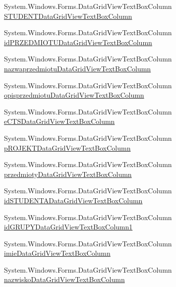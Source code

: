 \begin{DoxyCompactItemize}
\item 
System.\+Windows.\+Forms.\+Data\+Grid\+View\+Text\+Box\+Column \hyperlink{class_dziennik_ocen_1_1_form_admin_a6917f007b27f260cce5ecfd24aa351f7}{S\+T\+U\+D\+E\+N\+T\+Data\+Grid\+View\+Text\+Box\+Column}
\item 
System.\+Windows.\+Forms.\+Data\+Grid\+View\+Text\+Box\+Column \hyperlink{class_dziennik_ocen_1_1_form_admin_a26e4a3fa2dc997dc2639bad664efcf95}{id\+P\+R\+Z\+E\+D\+M\+I\+O\+T\+U\+Data\+Grid\+View\+Text\+Box\+Column}
\item 
System.\+Windows.\+Forms.\+Data\+Grid\+View\+Text\+Box\+Column \hyperlink{class_dziennik_ocen_1_1_form_admin_aabccbc0a74ca00a35018db908f23d017}{nazwaprzedmiotu\+Data\+Grid\+View\+Text\+Box\+Column}
\item 
System.\+Windows.\+Forms.\+Data\+Grid\+View\+Text\+Box\+Column \hyperlink{class_dziennik_ocen_1_1_form_admin_afa13eec734673382f86da87f33c5e52c}{opisprzedmiotu\+Data\+Grid\+View\+Text\+Box\+Column}
\item 
System.\+Windows.\+Forms.\+Data\+Grid\+View\+Text\+Box\+Column \hyperlink{class_dziennik_ocen_1_1_form_admin_a0680998f0013ced8888ab26f994b4312}{e\+C\+T\+S\+Data\+Grid\+View\+Text\+Box\+Column}
\item 
System.\+Windows.\+Forms.\+Data\+Grid\+View\+Text\+Box\+Column \hyperlink{class_dziennik_ocen_1_1_form_admin_a725b610994a951c46baa95371ca45e19}{p\+R\+O\+J\+E\+K\+T\+Data\+Grid\+View\+Text\+Box\+Column}
\item 
System.\+Windows.\+Forms.\+Data\+Grid\+View\+Text\+Box\+Column \hyperlink{class_dziennik_ocen_1_1_form_admin_aeab4a6aad13107f7f5e9fc5d6a61f803}{przedmioty\+Data\+Grid\+View\+Text\+Box\+Column}
\item 
System.\+Windows.\+Forms.\+Data\+Grid\+View\+Text\+Box\+Column \hyperlink{class_dziennik_ocen_1_1_form_admin_a9e981188d1513025f31ea53b1e54fe86}{id\+S\+T\+U\+D\+E\+N\+T\+A\+Data\+Grid\+View\+Text\+Box\+Column}
\item 
System.\+Windows.\+Forms.\+Data\+Grid\+View\+Text\+Box\+Column \hyperlink{class_dziennik_ocen_1_1_form_admin_aad503d02e5dd2a769147167a75af6af6}{id\+G\+R\+U\+P\+Y\+Data\+Grid\+View\+Text\+Box\+Column1}
\item 
System.\+Windows.\+Forms.\+Data\+Grid\+View\+Text\+Box\+Column \hyperlink{class_dziennik_ocen_1_1_form_admin_ad2c069cbc1f999203c0c1321be68d3df}{imie\+Data\+Grid\+View\+Text\+Box\+Column}
\item 
System.\+Windows.\+Forms.\+Data\+Grid\+View\+Text\+Box\+Column \hyperlink{class_dziennik_ocen_1_1_form_admin_aab4cfa6124fdde86f95e8c79c5c23406}{nazwisko\+Data\+Grid\+View\+Text\+Box\+Column}

\end{DoxyCompactItemize}
